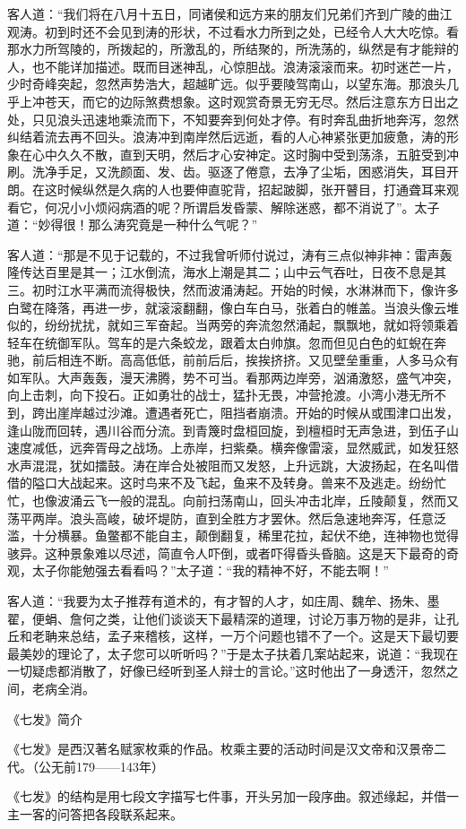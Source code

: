 客人道：“我们将在八月十五日，同诸侯和远方来的朋友们兄弟们齐到广陵的曲江观涛。初到时还不会见到涛的形状，不过看水力所到之处，已经令人大大吃惊。看那水力所驾陵的，所拨起的，所激乱的，所结聚的，所洗荡的，纵然是有才能辩的人，也不能详加描述。既而目迷神乱，心惊胆战。浪涛滚滚而来。初时迷芒一片，少时奇峰突起，忽然声势浩大，超越旷远。似乎要陵驾南山，以望东海。那浪头几乎上冲苍天，而它的边际煞费想象。这时观赏奇景无穷无尽。然后注意东方日出之处，只见浪头迅速地乘流而下，不知要奔到何处才停。有时奔乱曲折地奔泻，忽然纠结着流去再不回头。浪涛冲到南岸然后远逝，看的人心神紧张更加疲惫，涛的形象在心中久久不散，直到天明，然后才心安神定。这时胸中受到荡涤，五脏受到冲刷。洗净手足，又洗颜面、发、齿。驱逐了倦意，去净了尘垢，困惑消失，耳目开朗。在这时候纵然是久病的人也要伸直驼背，招起跛脚，张开瞽目，打通聋耳来观看它，何况小小烦闷病酒的呢？所谓启发昏蒙、解除迷惑，都不消说了”。太子道：“妙得很！那么涛究竟是一种什么气呢？”

客人道：“那是不见于记载的，不过我曾听师付说过，涛有三点似神非神：雷声轰隆传达百里是其一；江水倒流，海水上潮是其二；山中云气吞吐，日夜不息是其三。初时江水平满而流得极快，然而波涌涛起。开始的时候，水淋淋而下，像许多白鹭在降落，再进一步，就滚滚翻翻，像白车白马，张着白的帷盖。当浪头像云堆似的，纷纷扰扰，就如三军奋起。当两旁的奔流忽然涌起，飘飘地，就如将领乘着轻车在统御军队。驾车的是六条蛟龙，跟着太白帅旗。忽而但见白色的虹蜺在奔驰，前后相连不断。高高低低，前前后后，挨挨挤挤。又见壁垒重重，人多马众有如军队。大声轰轰，漫天沸腾，势不可当。看那两边岸旁，汹涌激怒，盛气冲突，向上击刺，向下投石。正如勇壮的战士，猛扑无畏，冲营抢渡。小湾小港无所不到，跨出崖岸越过沙滩。遭遇者死亡，阻挡者崩溃。开始的时候从或围津口出发，逢山陇而回转，遇川谷而分流。到青篾时盘桓回旋，到檀桓时无声急进，到伍子山速度减低，远奔胥母之战场。上赤岸，扫紫桑。横奔像雷滚，显然威武，如发狂怒水声混混，犹如擂鼓。涛在岸合处被阻而又发怒，上升远跳，大波扬起，在名叫借借的隘口大战起来。这时鸟来不及飞起，鱼来不及转身。兽来不及逃走。纷纷忙忙，也像波涌云飞一般的混乱。向前扫荡南山，回头冲击北岸，丘陵颠复，然而又荡平两岸。浪头高峻，破坏堤防，直到全胜方才罢休。然后急速地奔泻，任意泛滥，十分横暴。鱼鳖都不能自主，颠倒翻复，稀里花拉，起伏不绝，连神物也觉得骇异。这种景象难以尽述，简直令人吓倒，或者吓得昏头昏脑。这是天下最奇的奇观，太子你能勉强去看看吗？”太子道：“我的精神不好，不能去啊！”

客人道：“我要为太子推荐有道术的，有才智的人才，如庄周、魏牟、扬朱、墨翟，便蜎、詹何之类，让他们谈谈天下最精深的道理，讨论万事万物的是非，让孔丘和老聃来总结，孟子来稽核，这样，一万个问题也错不了一个。这是天下最切要最美妙的理论了，太子您可以听听吗？”于是太子扶着几案站起来，说道：“我现在一切疑虑都消散了，好像已经听到圣人辩士的言论。”这时他出了一身透汗，忽然之间，老病全消。

《七发》简介

《七发》是西汉著名赋家枚乘的作品。枚乘主要的活动时间是汉文帝和汉景帝二代。（公无前179——143年）

《七发》的结构是用七段文字描写七件事，开头另加一段序曲。叙述缘起，并借一主一客的问答把各段联系起来。


